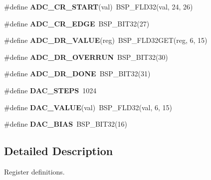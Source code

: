 \begin{DoxyCompactItemize}
$$\item 
\mbox{\label{group__lpc24xx__regs_gaf2e407e2b8b655960eff138bfe512d6e}} 
\#define {\bfseries A\+D\+C\+\_\+\+C\+R\+\_\+\+S\+T\+A\+RT}(val)~B\+S\+P\+\_\+\+F\+L\+D32(val, 24, 26)
\item 
\mbox{\label{group__lpc24xx__regs_ga1d05d43234dd2d1489841dff0012225e}} 
\#define {\bfseries A\+D\+C\+\_\+\+C\+R\+\_\+\+E\+D\+GE}~B\+S\+P\+\_\+\+B\+I\+T32(27)
\item 
\mbox{\label{group__lpc24xx__regs_gaf16b60644f26c1c5235bfa4ef61bc529}} 
\#define {\bfseries A\+D\+C\+\_\+\+D\+R\+\_\+\+V\+A\+L\+UE}(reg)~B\+S\+P\+\_\+\+F\+L\+D32\+G\+ET(reg, 6, 15)
\item 
\mbox{\label{group__lpc24xx__regs_ga9b38483d3b4879c31408525f66fec07e}} 
\#define {\bfseries A\+D\+C\+\_\+\+D\+R\+\_\+\+O\+V\+E\+R\+R\+UN}~B\+S\+P\+\_\+\+B\+I\+T32(30)
\item 
\mbox{\label{group__lpc24xx__regs_ga4d9cd1222f02b3e5542dd73fc46c52c3}} 
\#define {\bfseries A\+D\+C\+\_\+\+D\+R\+\_\+\+D\+O\+NE}~B\+S\+P\+\_\+\+B\+I\+T32(31)
\item 
\mbox{\label{group__lpc24xx__regs_ga9727a4191e20dffac66504fc3ad6ed80}} 
\#define {\bfseries D\+A\+C\+\_\+\+S\+T\+E\+PS}~1024
\item 
\mbox{\label{group__lpc24xx__regs_ga1f459c46c965f8761c0c198279878904}} 
\#define {\bfseries D\+A\+C\+\_\+\+V\+A\+L\+UE}(val)~B\+S\+P\+\_\+\+F\+L\+D32(val, 6, 15)
\item 
\mbox{\label{group__lpc24xx__regs_gad8517f59474c002252b8f2d5896d4ad2}} 
\#define {\bfseries D\+A\+C\+\_\+\+B\+I\+AS}~B\+S\+P\+\_\+\+B\+I\+T32(16)
\end{DoxyCompactItemize}


\subsection{Detailed Description}
Register definitions. 



